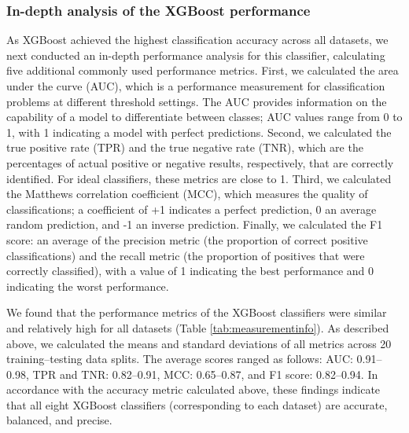 \documentclass{bmcart}
\begin{document}
\subsubsection*{In-depth analysis of the XGBoost performance}
As XGBoost achieved the highest classification accuracy across all datasets, we next conducted an in-depth performance analysis for this classifier, calculating five additional commonly used performance metrics. 
First, we calculated the area under the curve (AUC), which is a performance measurement for classification problems at different threshold settings. The AUC provides information on the capability of a model to differentiate between classes; AUC values range from 0 to 1, with 1 indicating a model with perfect predictions. 
Second, we calculated the true positive rate (TPR) and the true negative rate (TNR), which are the percentages of actual positive or negative results, respectively, that are correctly identified.  For ideal classifiers, these metrics are close to 1. Third, we calculated the Matthews correlation coefficient (MCC), which measures the quality of classifications; a coefficient of +1 indicates a perfect prediction, 0 an average random prediction, and -1 an inverse prediction. 
Finally, we calculated the F1 score: an average of the precision metric (the proportion of correct positive classifications) and the recall metric (the proportion of positives that were correctly classified), with a value of 1 indicating the best performance and 0 indicating the worst performance. 

We found that the performance metrics of the XGBoost classifiers were similar and relatively high for all datasets (Table \ref{tab:measurementinfo}). As described above, we calculated the means and standard deviations of all metrics across 20 training--testing data splits. The average scores ranged as follows: AUC: 0.91--0.98, TPR and TNR: 0.82--0.91, MCC: 0.65--0.87, and F1 score: 0.82--0.94. In accordance with the accuracy metric calculated above, these findings indicate that all eight XGBoost classifiers (corresponding to each dataset) are accurate, balanced, and precise. 
\end{document}
